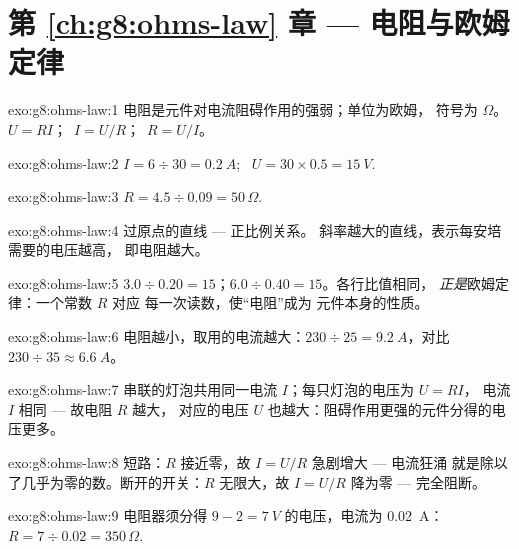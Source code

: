 \section*{第 \ref{ch:g8:ohms-law} 章 --- 电阻与欧姆定律}

\begin{solution}{exo:g8:ohms-law:1}
电阻是元件对电流阻碍作用的强弱；单位为欧姆，
符号为 $\Omega$。$U = R I$；\ $I = U/R$；\ $R = U/I$。
\end{solution}

\begin{solution}{exo:g8:ohms-law:2}
$I = 6 \div 30 = \qty{0.2}{A}$; \ $U = 30 \times 0.5 =
\qty{15}{V}$.
\end{solution}

\begin{solution}{exo:g8:ohms-law:3}
$R = 4.5 \div 0.09 = 50\,\Omega$.
\end{solution}

\begin{solution}{exo:g8:ohms-law:4}
过原点的直线 --- 正比例关系。
斜率越大的直线，表示每安培需要的电压越高，
即电阻越大。
\end{solution}

\begin{solution}{exo:g8:ohms-law:5}
$3.0 \div 0.20 = 15$；$6.0 \div 0.40 = 15$。各行比值相同，
\emph{正是}欧姆定律：一个常数 $R$ 对应
每一次读数，使“电阻”成为
元件本身的性质。
\end{solution}

\begin{solution}{exo:g8:ohms-law:6}
电阻越小，取用的电流越大：$230 \div 25 =
\qty{9.2}{A}$，对比 $230 \div 35 \approx \qty{6.6}{A}$。
\end{solution}

\begin{solution}{exo:g8:ohms-law:7}
串联的灯泡共用同一电流 $I$；每只灯泡的电压为 $U = R I$，
电流 $I$ 相同 --- 故电阻 $R$ 越大，
对应的电压 $U$ 也越大：阻碍作用更强的元件分得的电压更多。
\end{solution}

\begin{solution}{exo:g8:ohms-law:8}
短路：$R$ 接近零，故 $I = U/R$ 急剧增大 --- 电流狂涌
就是除以了几乎为零的数。断开的开关：$R$
无限大，故 $I = U/R$ 降为零 ---
完全阻断。
\end{solution}

\begin{solution}{exo:g8:ohms-law:9}
电阻器须分得 $9 - 2 = \qty{7}{V}$ 的电压，电流为 \qty{0.02}{A}：
$R = 7 \div 0.02 = 350\,\Omega$.
\end{solution}

